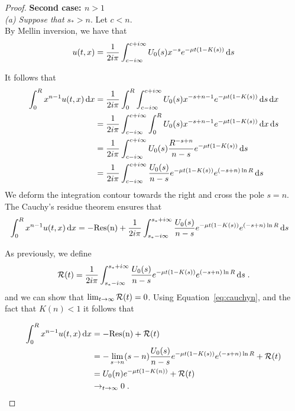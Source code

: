 \begin{proof}
        \textbf{Second case: $ n > 1$ }\\
        
        \textit{(a) Suppose that $s_* > n$}. Let $c<n$. \\
            By Mellin inversion, we have that
            \begin{align*}
                u(t,x) = \frac{1}{2i\pi}\int_{c-i\infty}^{c+i\infty} U_0(s) x^{-s} e^{-\mu t(1 - K(s))} \,\mathrm{d} s
            \end{align*}
        
        It follows that
        \begin{align*}
            \int_0^R x^{n-1}u(t,x) \,\mathrm{d} x 
            &= \frac{1}{2i\pi} \int_0^R \int_{c-i\infty}^{c+i\infty} U_0(s) x^{-s+n-1} e^{-\mu t(1 - K(s))} \,\mathrm{d} s \,\mathrm{d} x \\
            &= \frac{1}{2i\pi} \int_{c-i\infty}^{c+i\infty} \int_0^R U_0(s) x^{-s+n-1} e^{-\mu t(1 - K(s))} \,\mathrm{d} x \,\mathrm{d} s \\
            &= \frac{1}{2i\pi} \int_{c-i\infty}^{c+i\infty} U_0(s) \frac{R^{-s+n}}{n-s} e^{-\mu t(1 - K(s))} \,\mathrm{d} s \\
            &= \frac{1}{2i\pi} \int_{c-i\infty}^{c+i\infty} \frac{U_0(s)}{n-s} e^{-\mu t(1 - K(s))} e^{(-s+n)\ln R} \,\mathrm{d} s
        \end{align*}
        We deform the integration contour towards the right and cross the pole $s = n$. The Cauchy's residue theorem ensures that
        \begin{align}
            \int_0^R x^{n-1}u(t,x) \,\mathrm{d} x &= -\mathrm{Res(n)} + \frac{1}{2i\pi} \int_{s_*-i\infty}^{s_*+i\infty} \frac{U_0(s)}{n-s} e^{-\mu t(1 - K(s))} e^{(-s+n)\ln R} \,\mathrm{d} s 
            \label{eq:cauchyn}
        \end{align}
        
        
        As previously, we define
        \begin{align*}
            \mathcal{R}(t) = \frac{1}{2i\pi} \int_{s_*-i\infty}^{s_*+i\infty} \frac{U_0(s)}{n-s} e^{-\mu t(1 - K(s))} e^{(-s+n)\ln R} \,\mathrm{d} s
            \; .
        \end{align*}
        and we can show that $\lim_{t\to\infty}\mathcal{R}(t) = 0$. Using Equation~\ref{eq:cauchyn}, and the fact that $K(n) < 1$ it follows that 
        
        
        \begin{align*}
            \int_0^R x^{n-1}u(t,x) \,\mathrm{d} x &= -\mathrm{Res(n)} + \mathcal{R}(t) \\
            &= -\lim_{s \to n} (s-n)\frac{U_0(s)}{n-s} e^{-\mu t(1 - K(s))} e^{(-s+n)\ln R}  + \mathcal{R}(t)\\
            &= U_0(n)e^{-\mu t(1 - K(n))} + \mathcal{R}(t)\\
            &\to_{t \to \infty} 0
            \; .
        \end{align*}


\end{proof}
